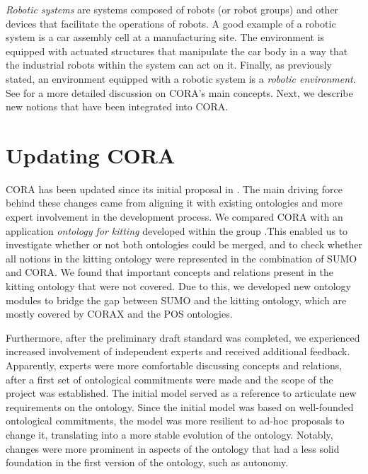 \documentclass[preprint,12pt]{elsarticle}
\begin{document}
{\it Robotic systems} are systems composed of robots (or robot groups) and other devices that facilitate the operations of robots. A good example of a robotic system is a car assembly cell at a manufacturing site. The environment is equipped with actuated structures that manipulate the car body in a way that the industrial robots within the system can act on it. Finally, as previously stated, an environment equipped with a robotic system is a {\it robotic environment}.
See \cite{prestes2013towards,carbonera2013defining} for a more detailed discussion on CORA's main concepts. Next, we describe new notions that have been integrated into CORA. 


\section{Updating CORA}

CORA has been updated since its initial proposal in \cite{prestes2013towards,carbonera2013defining}. The main driving force behind these changes came from aligning it with existing ontologies and more expert involvement in the development process. We compared CORA with an application \textit{ontology for kitting} developed within the group \cite{balakirsky2013knowledge}.This enabled us to investigate whether or not both ontologies could be merged, and to check whether all notions in the kitting ontology were represented in the combination of SUMO and CORA. We found that important concepts and relations present in the kitting ontology that were not covered. Due to this, we developed new ontology modules to bridge the gap between SUMO and the kitting ontology, which are mostly covered by CORAX and the POS ontologies.

Furthermore, after the preliminary draft standard was completed, we experienced increased involvement of independent experts and received additional feedback. Apparently, experts were more comfortable discussing concepts and relations, after a first set of ontological commitments were made and the scope of the project was established. The initial model served as a reference to articulate new requirements on the ontology. Since the initial model was based on well-founded ontological commitments, the model was more resilient to ad-hoc proposals to change it, translating into a more stable evolution of the ontology. Notably, changes were more prominent in aspects of the ontology that had a less solid foundation in the first version of the ontology, such as autonomy. 
\end{document}
